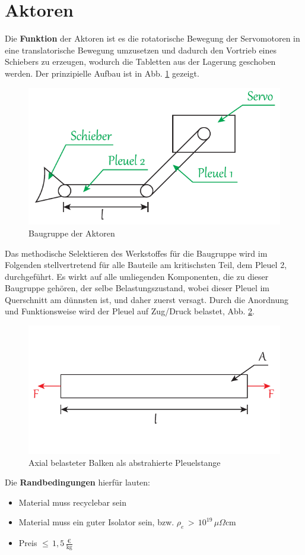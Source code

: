 \section{Aktoren}
Die \textbf{Funktion} der Aktoren ist es die rotatorische Bewegung der Servomotoren in eine translatorische Bewegung umzusetzen und dadurch den Vortrieb eines Schiebers zu erzeugen, wodurch die Tabletten aus der Lagerung geschoben werden. Der prinzipielle Aufbau ist in Abb. \ref{fig:3_6_a} gezeigt. 
\begin{figure}[H]
	\centering
	\includegraphics[width=0.7\linewidth]{chapter/Bilder/3_6_a}
	\caption{Baugruppe der Aktoren}
	\label{fig:3_6_a}
\end{figure}
Das methodische Selektieren des Werkstoffes für die Baugruppe wird im Folgenden stellvertretend für alle Bauteile am kritischsten Teil, dem Pleuel 2, durchgeführt. Es wirkt auf alle umliegenden Komponenten, die zu dieser Baugruppe gehören, der selbe Belastungszustand, wobei dieser Pleuel im Querschnitt am dünnsten ist, und daher zuerst versagt. Durch die Anordnung und Funktionsweise wird der Pleuel auf Zug/Druck belastet, Abb. \ref{fig:3_6_b}.
\begin{figure}[H]
	\centering
	\includegraphics[width=0.4\linewidth]{chapter/Bilder/3_6_b}
	\caption{Axial belasteter Balken als abstrahierte Pleuelstange}
	\label{fig:3_6_b}
\end{figure}
Die \textbf{Randbedingungen} hierfür lauten:
\begin{itemize}
	\item Material muss recyclebar sein
	\item Material muss ein guter Isolator sein, bzw. $\rho_e\,>\,10^{19}\,\mu\Omega$cm
	\item Preis $\le\,1,5\,\frac{\text{€}}{\text{kg}}$
\end{itemize}
